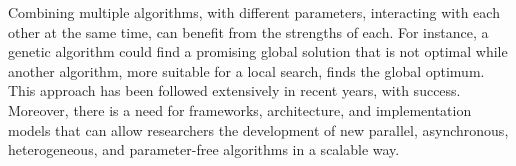 \documentclass[review]{elsarticle}
\begin{document}
Combining multiple algorithms, with different parameters, interacting with each
other at the same time, can benefit from the strengths of each. For instance, a
genetic algorithm could find a promising global solution that is not optimal
while another algorithm, more suitable for a local search, finds the global
optimum. This approach has been followed extensively in recent years, with
success. Moreover, there is a need for frameworks, architecture, and
implementation models that can allow researchers the development of new
parallel, asynchronous, heterogeneous, and parameter-free algorithms in a scalable way.  




\end{document}
